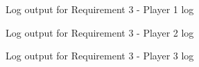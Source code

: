 \begin{figure}[H]
	 
	\caption{Log output for Requirement 3 - Player 1 log}
\end{figure}

\begin{figure}[H]
	 
	\caption{Log output for Requirement 3 - Player 2 log}
\end{figure}

\begin{figure}[H]
	 
	\caption{Log output for Requirement 3 - Player 3 log}
\end{figure}